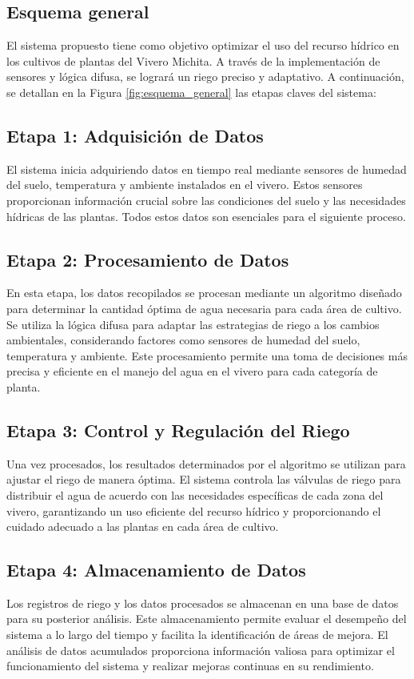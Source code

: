 \subsection{Esquema general}
El sistema propuesto tiene como objetivo optimizar el uso del recurso hídrico en los cultivos de plantas del Vivero Michita. A través de la implementación de sensores y lógica difusa, se logrará un riego preciso y adaptativo. A continuación, se detallan en la Figura \ref{fig:esquema_general} las etapas claves del sistema:



\subsection*{Etapa 1: Adquisición de Datos}
El sistema inicia adquiriendo datos en tiempo real mediante sensores de humedad del suelo, temperatura y ambiente instalados en el vivero. Estos sensores proporcionan información crucial sobre las condiciones del suelo y las necesidades hídricas de las plantas. Todos estos datos son esenciales para el siguiente proceso.

\subsection*{Etapa 2: Procesamiento de Datos}
En esta etapa, los datos recopilados se procesan mediante un algoritmo diseñado para determinar la cantidad óptima de agua necesaria para cada área de cultivo. Se utiliza la lógica difusa para adaptar las estrategias de riego a los cambios ambientales, considerando factores como sensores de humedad del suelo, temperatura y ambiente. Este procesamiento permite una toma de decisiones más precisa y eficiente en el manejo del agua en el vivero para cada categoría de planta.

\subsection*{Etapa 3: Control y Regulación del Riego}
Una vez procesados, los resultados determinados por el algoritmo se utilizan para ajustar el riego de manera óptima. El sistema controla las válvulas de riego para distribuir el agua de acuerdo con las necesidades específicas de cada zona del vivero, garantizando un uso eficiente del recurso hídrico y proporcionando el cuidado adecuado a las plantas en cada área de cultivo.

\subsection*{Etapa 4: Almacenamiento de Datos}
Los registros de riego y los datos procesados se almacenan en una base de datos para su posterior análisis. Este almacenamiento permite evaluar el desempeño del sistema a lo largo del tiempo y facilita la identificación de áreas de mejora. El análisis de datos acumulados proporciona información valiosa para optimizar el funcionamiento del sistema y realizar mejoras continuas en su rendimiento.

